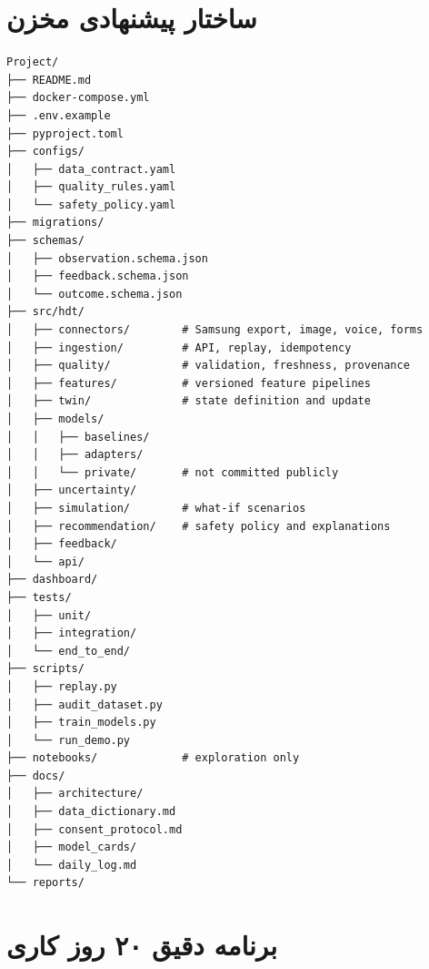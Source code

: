\documentclass[11pt,a4paper]{article}
\begin{document}
\section{ساختار پیشنهادی مخزن}

\begin{lstlisting}
Project/
├── README.md
├── docker-compose.yml
├── .env.example
├── pyproject.toml
├── configs/
│   ├── data_contract.yaml
│   ├── quality_rules.yaml
│   └── safety_policy.yaml
├── migrations/
├── schemas/
│   ├── observation.schema.json
│   ├── feedback.schema.json
│   └── outcome.schema.json
├── src/hdt/
│   ├── connectors/        # Samsung export, image, voice, forms
│   ├── ingestion/         # API, replay, idempotency
│   ├── quality/           # validation, freshness, provenance
│   ├── features/          # versioned feature pipelines
│   ├── twin/              # state definition and update
│   ├── models/
│   │   ├── baselines/
│   │   ├── adapters/
│   │   └── private/       # not committed publicly
│   ├── uncertainty/
│   ├── simulation/        # what-if scenarios
│   ├── recommendation/    # safety policy and explanations
│   ├── feedback/
│   └── api/
├── dashboard/
├── tests/
│   ├── unit/
│   ├── integration/
│   └── end_to_end/
├── scripts/
│   ├── replay.py
│   ├── audit_dataset.py
│   ├── train_models.py
│   └── run_demo.py
├── notebooks/             # exploration only
├── docs/
│   ├── architecture/
│   ├── data_dictionary.md
│   ├── consent_protocol.md
│   ├── model_cards/
│   └── daily_log.md
└── reports/
\end{lstlisting}

\section{برنامه دقیق ۲۰ روز کاری}
\end{document}
